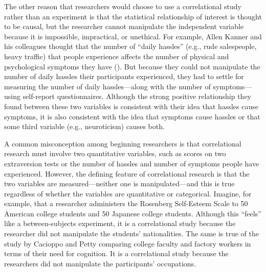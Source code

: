 \documentclass[
]{krantz}
\begin{document}
The other reason that researchers would choose to use a correlational study rather than an experiment is that the statistical relationship of interest is thought to be causal, but the researcher cannot manipulate the independent variable because it is impossible, impractical, or unethical. For example, Allen Kanner and his colleagues thought that the number of ``daily hassles'' (e.g., rude salespeople, heavy traffic) that people experience affects the number of physical and psychological symptoms they have (). But because they could not manipulate the number of daily hassles their participants experienced, they had to settle for measuring the number of daily hassles---along with the number of symptoms---using self-report questionnaires. Although the strong positive relationship they found between these two variables is consistent with their idea that hassles cause symptoms, it is also consistent with the idea that symptoms cause hassles or that some third variable (e.g., neuroticism) causes both.

A common misconception among beginning researchers is that correlational research must involve two quantitative variables, such as scores on two extraversion tests or the number of hassles and number of symptoms people have experienced. However, the defining feature of correlational research is that the two variables are measured---neither one is manipulated---and this is true regardless of whether the variables are quantitative or categorical. Imagine, for example, that a researcher administers the Rosenberg Self-Esteem Scale to 50 American college students and 50 Japanese college students. Although this ``feels'' like a between-subjects experiment, it is a correlational study because the researcher did not manipulate the students' nationalities. The same is true of the study by Cacioppo and Petty comparing college faculty and factory workers in terms of their need for cognition. It is a correlational study because the researchers did not manipulate the participants' occupations.
\end{document}
